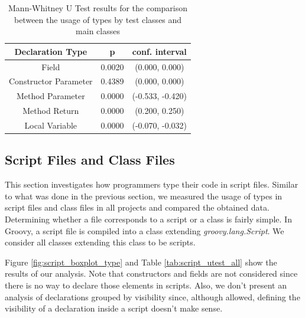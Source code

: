 \documentclass[preprint]{sigplanconf}
\begin{document}
\begin{table}[h!]
\centering{}%
\begin{tabular}{|c|c|c|}
\hline 
Declaration Type 		& p & conf. interval \\
\hline 
\hline 
Field                             & 0.0020		& (0.000, 0.000) \\ \hline
Constructor Parameter  & 0.4389	& (0.000, 0.000) \\ \hline
Method Parameter         & 0.0000	& (-0.533, -0.420) \\ \hline
Method Return              & 0.0000	& (0.200, 0.250) \\ \hline
Local Variable               & 0.0000		& (-0.070, -0.032) \\ 
\hline 
\end{tabular}
\label{tab:test_utest_type}
\caption{Mann-Whitney U Test results for the comparison between the usage of types by test classes and main classes}
\end{table}

\subsection{Script Files and Class Files\label{res-test-scripts}}
This section investigates how programmers type their code in script files.
Similar to what was done in the previous section, we measured the usage of types in script files and class files in all projects and compared the obtained data.
Determining whether a file corresponds to a script or a class is fairly simple.
In Groovy, a script file is compiled into a class extending \emph{groovy.lang.Script}.
We consider all classes extending this class to be scripts.

Figure \ref{fig:script_boxplot_type} and Table \ref{tab:script_utest_all} show the results of our analysis.
Note that constructors and fields are not considered since there is no way to declare those elements in scripts.
Also, we don't present an analysis of declarations grouped by visibility since, although allowed, defining the visibility of a declaration inside a script doesn't make sense.
\end{document}
